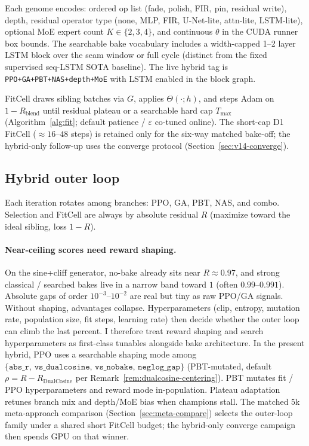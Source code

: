 Each genome encodes: ordered op list (fade, polish, FIR, pin, residual write), depth, residual operator type (none, MLP, FIR, U-Net-lite, attn-lite, LSTM-lite), optional MoE expert count $K\in\{2,3,4\}$, and continuous $\theta$ in the CUDA runner box bounds.
The searchable bake vocabulary includes a width-capped 1--2 layer LSTM block over the seam window or full cycle (distinct from the fixed supervised seq-LSTM SOTA baseline).
The live hybrid tag is \texttt{PPO+GA+PBT+NAS+depth+MoE} with LSTM enabled in the block graph.

FitCell draws sibling batches via $G$, applies $\Theta(\cdot;h)$, and steps Adam on $1-R_{\mathrm{blend}}$ until residual plateau or a searchable hard cap $T_{\max}$ (Algorithm~\ref{alg:fit}; default patience / $\varepsilon$ co-tuned online).
The short-cap D1 FitCell (${\approx}16$--$48$ steps) is retained only for the six-way matched bake-off; the hybrid-only follow-up uses the converge protocol (Section~\ref{sec:v14-converge}).

\subsection{Hybrid outer loop}
\label{sec:hybrid}

Each iteration rotates among branches: PPO, GA, PBT, NAS, and combo.
Selection and FitCell are always by absolute residual $R$ (maximize toward the ideal sibling, loss $1-R$).

\paragraph{Near-ceiling scores need reward shaping.}
\label{sec:reward-shaping}
On the sine{+}cliff generator, no-bake already sits near $R\approx 0.97$, and strong classical / searched bakes live in a narrow band toward $1$ (often $0.99$--$0.991$).
Absolute gaps of order $10^{-3}$--$10^{-2}$ are real but tiny as raw PPO/GA signals.
Without shaping, advantages collapse.
Hyperparameters (clip, entropy, mutation rate, population size, fit steps, learning rate) then decide whether the outer loop can climb the last percent.
I therefore treat reward shaping and search hyperparameters as first-class tunables alongside bake architecture.
In the present hybrid, PPO uses a searchable shaping mode among $\{\texttt{abs\_r},\,\texttt{vs\_dualcosine},\,\texttt{vs\_nobake},\,\texttt{neglog\_gap}\}$ (PBT-mutated, default $\rho = R - R_{\mathrm{DualCosine}}$ per Remark~\ref{rem:dualcosine-centering}).
PBT mutates fit / PPO hyperparameters and reward mode in-population. Plateau adaptation retunes branch mix and depth/MoE bias when champions stall.
The matched $5$k meta-approach comparison (Section~\ref{sec:meta-compare}) selects the outer-loop family under a shared short FitCell budget; the hybrid-only converge campaign then spends GPU on that winner.

